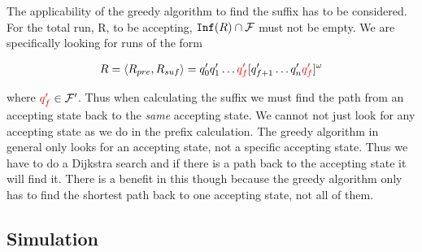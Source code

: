 The applicability of the greedy algorithm to find the suffix has to be considered. For the total run, R, to be accepting, $\texttt{Inf}(R) \cap \mathcal{F}$ must not be empty. We are specifically looking for runs of the form 

\begin{align*}
R &= \langle R_{pre}, R_{suf} \rangle = q_0' q_1' \dots {\color{red} q_f'} [q_{f+1}' \dots q_n' {\color{red} q_f'}]^\omega \\
\end{align*}

where ${\color{red} q_f'} \in \mathcal{F}'$. Thus when calculating the suffix we must find the path from an accepting state back to the \textit{same} accepting state. We cannot not just look for any accepting state as we do in the prefix calculation. The greedy algorithm in general only looks for an accepting state, not a specific accepting state. Thus we have to do a Dijkstra search and if there is a path back to the accepting state it will find it. There is a benefit in this though because the greedy algorithm only has to find the shortest path back to one accepting state, not all of them.


\subsection{Simulation}





